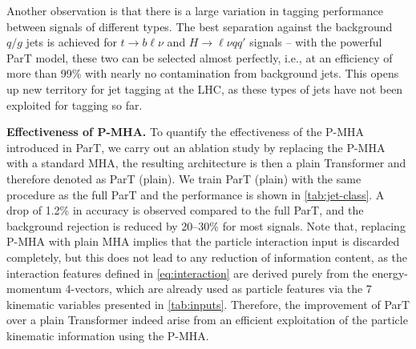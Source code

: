 \documentclass[nohyperref]{article}
\theoremstyle{plain}
\theoremstyle{definition}
\theoremstyle{remark}
\newcommand{\hlvqq}{\ensuremath{H\to \ell \nu q q'}\xspace}
\newcommand{\tblv}{\ensuremath{t\to b \ell \nu}\xspace}
\newcommand{\qgj}{\ensuremath{q/g}\xspace}
\begin{document}
Another observation is that there is a large variation in tagging performance between signals of different types. The best separation against the background \qgj jets is achieved for \tblv and \hlvqq signals -- with the powerful ParT model, these two can be selected almost perfectly, i.e., at an efficiency of more than 99\% with nearly no contamination from background jets. This opens up new territory for jet tagging at the LHC, as these types of jets have not been exploited for tagging so far.

\textbf{Effectiveness of P-MHA.} To quantify the effectiveness of the P-MHA introduced in ParT, we carry out an ablation study by replacing the P-MHA with a standard MHA, the resulting architecture is then a plain Transformer and therefore denoted as ParT (plain). We train ParT (plain) with the same procedure as the full ParT and the performance is shown in \cref{tab:jet-class}. A drop of 1.2\% in accuracy is observed compared to the full ParT, and the background rejection is reduced by 20--30\% for most signals. Note that, replacing P-MHA with plain MHA implies that the particle interaction input is discarded completely, but this does not lead to any reduction of information content, as the interaction features defined in \cref{eq:interaction} are derived purely from the energy-momentum 4-vectors, which are already used as particle features via the 7 kinematic variables presented in \cref{tab:inputs}. Therefore, the improvement of ParT over a plain Transformer indeed arise from an efficient exploitation of the particle kinematic information using the P-MHA. 

{\vskip 0.15in}
\end{document}
